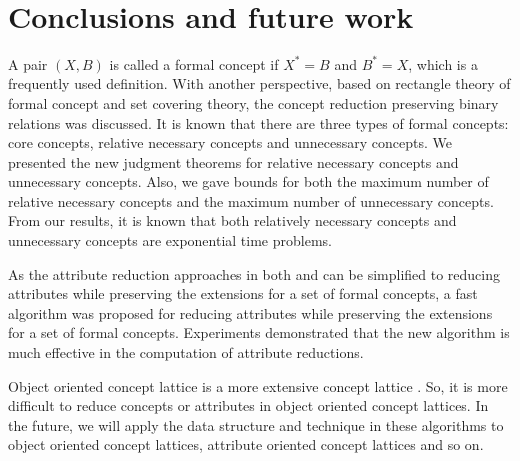 \documentclass[11pt]{article}
\numberwithin{equation}{subsection}
\begin{document}
\newpage


\




\section{Conclusions and future work\label{s5}}

 A pair $(X, B)$   is called a formal concept if $X^*=B$ and $B^*=X$, which is a frequently used definition. With another perspective,
based on rectangle theory of formal concept and set covering theory, the concept reduction preserving binary
relations was discussed. It is known that there are three types of formal concepts:  core concepts, relative necessary concepts and
unnecessary concepts. We presented the new judgment theorems for relative necessary concepts and
unnecessary concepts. Also, we  gave  bounds for both the maximum number of relative necessary concepts and the maximum number of unnecessary concepts. From our results, it is known that both relatively necessary concepts and unnecessary concepts are exponential time problems.


As the attribute reduction approaches in both \cite{Zhang} and \cite{Li}  can be simplified to  reducing attributes while preserving the extensions for a set of formal concepts,
a fast algorithm was proposed for  reducing attributes while preserving the extensions for a set of  formal concepts. Experiments demonstrated that the new algorithm is much  effective  in the computation of attribute reductions.

Object oriented concept lattice is a more extensive concept lattice \cite{Yao}. So, it is more difficult to reduce concepts or attributes in object oriented concept lattices.
In the future, we will apply the data structure and technique in these algorithms  to  object oriented concept lattices, %
attribute oriented concept lattices and so on.


%
\end{document}
